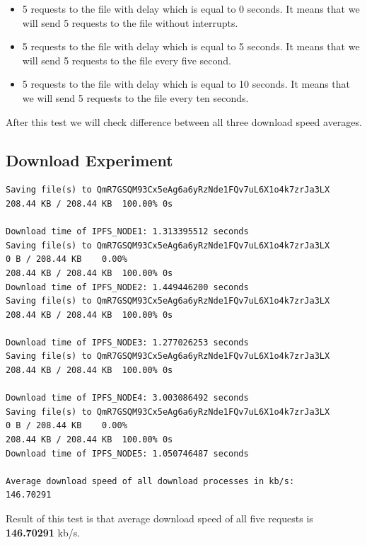 \documentclass[a4paper,12pt,fleqn]{article}
\begin{document}
\begin{itemize}
    \item 5 requests to the file with delay which is equal to 0 seconds. It means that we will send 5 requests to the file without interrupts.
    \item 5 requests to the file with delay which is equal to 5 seconds. It means that we will send 5 requests to the file every five second.
    \item 5 requests to the file with delay which is equal to 10 seconds. It means that we will send 5 requests to the file every ten seconds.
\end{itemize}

After this test we will check difference between all three download speed averages.

\subsection{Download Experiment}

\begin{lstlisting}[caption={Download test with delay which is equal to 0 seconds.},label={abc}]
Saving file(s) to QmR7GSQM93Cx5eAg6a6yRzNde1FQv7uL6X1o4k7zrJa3LX
208.44 KB / 208.44 KB  100.00% 0s

Download time of IPFS_NODE1: 1.313395512 seconds
Saving file(s) to QmR7GSQM93Cx5eAg6a6yRzNde1FQv7uL6X1o4k7zrJa3LX
0 B / 208.44 KB    0.00%
208.44 KB / 208.44 KB  100.00% 0s
Download time of IPFS_NODE2: 1.449446200 seconds
Saving file(s) to QmR7GSQM93Cx5eAg6a6yRzNde1FQv7uL6X1o4k7zrJa3LX
208.44 KB / 208.44 KB  100.00% 0s

Download time of IPFS_NODE3: 1.277026253 seconds
Saving file(s) to QmR7GSQM93Cx5eAg6a6yRzNde1FQv7uL6X1o4k7zrJa3LX
208.44 KB / 208.44 KB  100.00% 0s

Download time of IPFS_NODE4: 3.003086492 seconds
Saving file(s) to QmR7GSQM93Cx5eAg6a6yRzNde1FQv7uL6X1o4k7zrJa3LX
0 B / 208.44 KB    0.00%
208.44 KB / 208.44 KB  100.00% 0s
Download time of IPFS_NODE5: 1.050746487 seconds

Average download speed of all download processes in kb/s:
146.70291
\end{lstlisting}    

Result of this test is that average download speed of all five requests is \textbf{146.70291} kb/s.
\end{document}
